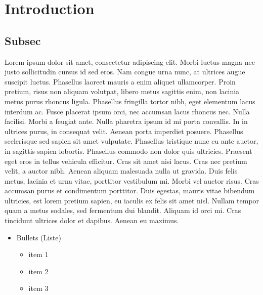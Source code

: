 \documentclass[11pt]{article}
\begin{document}
\clearpage
\section{Introduction}
\subsection{Subsec}

Lorem ipsum dolor sit amet, consectetur adipiscing elit. 
Morbi luctus magna nec justo sollicitudin cursus id sed eros. 
Nam congue urna nunc, at ultrices augue suscipit luctus. Phasellus
 laoreet mauris a enim aliquet ullamcorper. Proin pretium, risus non aliquam volutpat, libero metus sagittis enim, non lacinia metus purus rhoncus ligula. Phasellus fringilla tortor nibh, eget elementum lacus interdum ac. Fusce placerat ipsum orci, nec accumsan lacus rhoncus nec. Nulla facilisi. Morbi a feugiat ante. Nulla pharetra ipsum id mi porta convallis. In in ultrices purus, in consequat velit. Aenean porta imperdiet posuere. Phasellus scelerisque sed sapien sit amet vulputate. Phasellus tristique nunc eu ante auctor, in sagittis sapien lobortis. Phasellus commodo non dolor quis ultricies. Praesent eget eros in tellus vehicula efficitur. Cras sit amet nisi lacus. 
Cras nec pretium velit, a auctor nibh. Aenean aliquam malesuada nulla ut 
gravida. Duis felis metus, lacinia et urna vitae, porttitor vestibulum mi. 
Morbi vel auctor risus. Cras accumsan purus et condimentum porttitor. Duis egestas, 
mauris vitae bibendum ultricies, est lorem pretium sapien, eu iaculis ex felis sit amet nisl. 
Nullam tempor quam a metus sodales, sed fermentum dui blandit. Aliquam id orci mi. Cras 
tincidunt ultrices dolor et dapibus. Aenean eu maximus.

\begin{itemize}
\item Bullets (Liste)
\begin{itemize}
\item item 1
\item item 2
\item item 3
\end{itemize}
\end{itemize}
\end{document}
